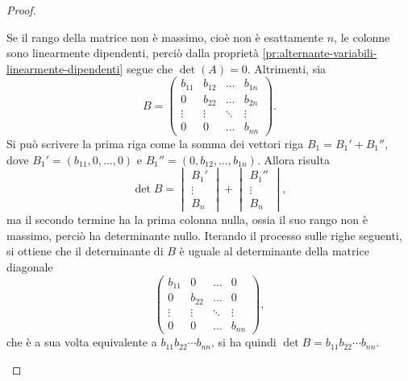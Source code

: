 \begin{proof}
\begin{enumerate}
		Se il rango della matrice non è massimo, cioè non è esattamente $n$, le colonne sono linearmente dipendenti, perciò dalla proprietà \ref{pr:alternante-variabili-linearmente-dipendenti} segue che $\det(A)=0$.
		Altrimenti, sia
		\begin{equation*}
			B=
			\begin{pmatrix}
				b_{11}	&b_{12}	&\dots	&b_{1n}\\
				0		&b_{22}	&\dots 	&b_{2n}\\
				\vdots 	&\vdots 	&\ddots 	&\vdots\\
				0		&0		&\dots 	&b_{nn}
			\end{pmatrix}.
		\end{equation*}
		Si può scrivere la prima riga come la somma dei vettori riga $B_1=B_1'+B_1''$, dove $B_1'=(b_{11},0,\dots,0)$ e $B_1''=(0,b_{12},\dots,b_{1n})$.
		Allora risulta
		\begin{equation*}
			\det B=
			\begin{vmatrix}
				B_1'\\\vdots\\B_n
			\end{vmatrix}
			+
			\begin{vmatrix}
				B_1''\\\vdots\\B_n
			\end{vmatrix},
		\end{equation*}
		ma il secondo termine ha la prima colonna nulla, ossia il suo rango non è massimo, perciò ha determinante nullo.
		Iterando il processo sulle righe seguenti, si ottiene che il determinante di $B$ è uguale al determinante della matrice diagonale
		\begin{equation*}
			\begin{pmatrix}
				b_{11}	&0		&\dots	&0\\
				0		&b_{22}	&\dots	&0\\
				\vdots 	&\vdots	&\ddots	&\vdots\\
				0		&0		&\dots	&b_{nn}
			\end{pmatrix},
		\end{equation*}
		che è a sua volta equivalente a $b_{11}b_{22}\cdots b_{nn}$, si ha quindi $\det B=b_{11}b_{22}\cdots b_{nn}$.
	\end{enumerate}
\end{proof}

